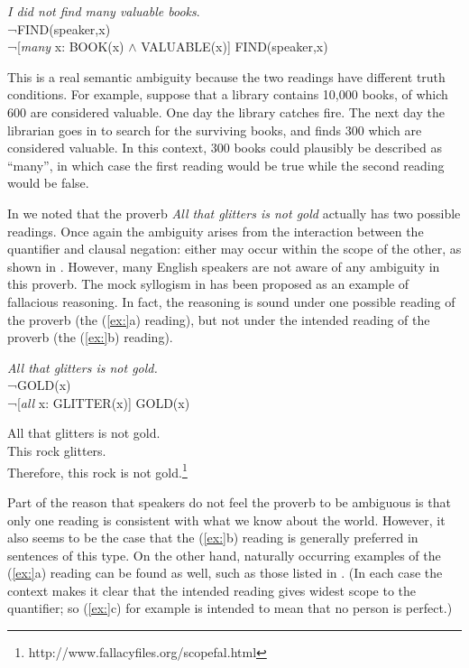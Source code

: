 \ea
\textit{I did not find many valuable books}.\\
 ¬FIND(speaker,x)\\
\ex  ¬[\textit{many} x: BOOK(x) $\wedge$ VALUABLE(x)] FIND(speaker,x)
                       \z
\z


This is a real semantic ambiguity because the two readings have different truth conditions. For example, suppose that a library contains 10,000 books, of which 600 are considered valuable. One day the library catches fire. The next day the librarian goes in to search for the surviving books, and finds 300 which are considered valuable. In this context, 300 books could plausibly be described as “many”, in which case the first reading would be true while the second reading would be false.



In  we noted that the proverb \textit{All that glitters is not gold} actually has two possible readings. Once again the ambiguity arises from the interaction between the quantifier and clausal negation: either may occur within the scope of the other, as shown in . However, many English speakers are not aware of any ambiguity in this proverb. The mock syllogism in  has been proposed as an example of fallacious reasoning. In fact, the reasoning is sound under one possible reading of the proverb (the (\ref{ex:}a) reading), but not under the intended reading of the proverb (the (\ref{ex:}b) reading).


\ea
\textit{All that glitters is not gold.}\\
 ¬GOLD(x)\\
\ex  ¬[\textit{all} x: GLITTER(x)] GOLD(x)
                       \z
\z

\ea
All that glitters is not gold.\\
This rock glitters.\\
Therefore, this rock is not gold.\footnote{http://www.fallacyfiles.org/scopefal.html}
\z


Part of the reason that speakers do not feel the proverb to be ambiguous is that only one reading is consistent with what we know about the world. However, it also seems to be the case that the (\ref{ex:}b) reading is generally preferred in sentences of this type. On the other hand, naturally occurring examples of the (\ref{ex:}a) reading can be found as well, such as those listed in . (In each case the context makes it clear that the intended reading gives widest scope to the quantifier; so (\ref{ex:}c) for example is intended to mean that no person is perfect.)


